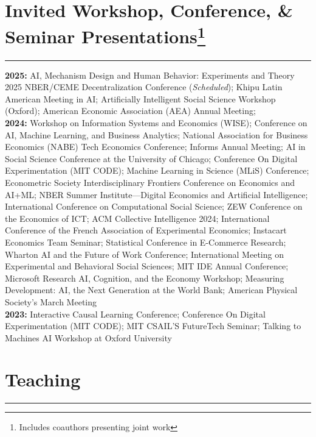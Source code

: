 \documentclass[11.25pt]{article}
\begin{document}
\vspace{-.45cm}

\section*{Invited Workshop, Conference, \& Seminar Presentations\footnote{Includes coauthors presenting joint work}}  \vspace{-1mm} \hrule
\vspace{3mm}
\textbf{2025:} 
AI, Mechanism Design and Human Behavior: Experiments and Theory 2025 NBER/CEME Decentralization Conference (\textit{Scheduled});
Khipu Latin American Meeting in AI;
Artificially Intelligent Social Science Workshop (Oxford);
American Economic Association (AEA) Annual Meeting;\vspace{3mm}\\
\textbf{2024:} Workshop on Information Systems and Economics (WISE);
Conference on AI, Machine Learning, and Business Analytics;
National Association for Business Economics (NABE) Tech Economics Conference; 
Informs Annual Meeting;
AI in Social Science Conference at the University of Chicago;
Conference On Digital Experimentation (MIT CODE);
Machine Learning in Science (MLiS) Conference;
Econometric Society Interdisciplinary Frontiers Conference on Economics and AI+ML; 
NBER Summer Institute---Digital Economics and Artificial Intelligence;
International Conference on Computational Social Science;
ZEW Conference on the Economics of ICT;
ACM Collective Intelligence 2024;
International Conference of the French Association of Experimental Economics;
Instacart Economics Team Seminar;
Statistical Conference in E-Commerce Research;
Wharton AI and the Future of Work Conference; 
International Meeting on Experimental and Behavioral Social Sciences;
MIT IDE Annual Conference; 
Microsoft Research AI, Cognition, and the Economy Workshop; 
Measuring Development: AI, the Next Generation at the World Bank; 
American Physical Society's March Meeting\vspace{3mm}\\
\textbf{2023:} Interactive Causal Learning Conference; 
Conference On Digital Experimentation (MIT CODE); 
MIT CSAIL'S FutureTech Seminar;
Talking to Machines AI Workshop at Oxford University
\\

\vspace{-.45cm}

\section*{Teaching}  \vspace{-1mm} \hrule
\vspace{3mm}
\end{document}
